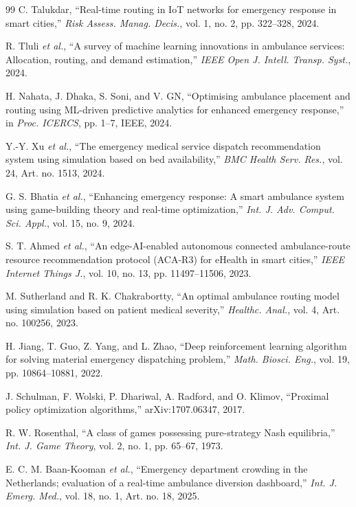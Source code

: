 \documentclass[conference]{IEEEtran}
\begin{document}
\begin{thebibliography}{99}
C. Talukdar, ``Real-time routing in IoT networks for emergency response in smart cities,'' \emph{Risk Assess. Manag. Decis.}, vol. 1, no. 2, pp. 322--328, 2024.

R. Tluli \emph{et al.}, ``A survey of machine learning innovations in ambulance services: Allocation, routing, and demand estimation,'' \emph{IEEE Open J. Intell. Transp. Syst.}, 2024.

H. Nahata, J. Dhaka, S. Soni, and V. GN, ``Optimising ambulance placement and routing using ML-driven predictive analytics for enhanced emergency response,'' in \emph{Proc. ICERCS}, pp. 1--7, IEEE, 2024.

Y.-Y. Xu \emph{et al.}, ``The emergency medical service dispatch recommendation system using simulation based on bed availability,'' \emph{BMC Health Serv. Res.}, vol. 24, Art. no. 1513, 2024.

G. S. Bhatia \emph{et al.}, ``Enhancing emergency response: A smart ambulance system using game-building theory and real-time optimization,'' \emph{Int. J. Adv. Comput. Sci. Appl.}, vol. 15, no. 9, 2024.

S. T. Ahmed \emph{et al.}, ``An edge-AI-enabled autonomous connected ambulance-route resource recommendation protocol (ACA-R3) for eHealth in smart cities,'' \emph{IEEE Internet Things J.}, vol. 10, no. 13, pp. 11497--11506, 2023.

M. Sutherland and R. K. Chakrabortty, ``An optimal ambulance routing model using simulation based on patient medical severity,'' \emph{Healthc. Anal.}, vol. 4, Art. no. 100256, 2023.

H. Jiang, T. Guo, Z. Yang, and L. Zhao, ``Deep reinforcement learning algorithm for solving material emergency dispatching problem,'' \emph{Math. Biosci. Eng.}, vol. 19, pp. 10864--10881, 2022.

J. Schulman, F. Wolski, P. Dhariwal, A. Radford, and O. Klimov, ``Proximal policy optimization algorithms,'' arXiv:1707.06347, 2017.

R. W. Rosenthal, ``A class of games possessing pure-strategy Nash equilibria,'' \emph{Int. J. Game Theory}, vol. 2, no. 1, pp. 65--67, 1973.

E. C. M. Baan-Kooman \emph{et al.}, ``Emergency department crowding in the Netherlands; evaluation of a real-time ambulance diversion dashboard,'' \emph{Int. J. Emerg. Med.}, vol. 18, no. 1, Art. no. 18, 2025.


\end{thebibliography}
\end{document}
